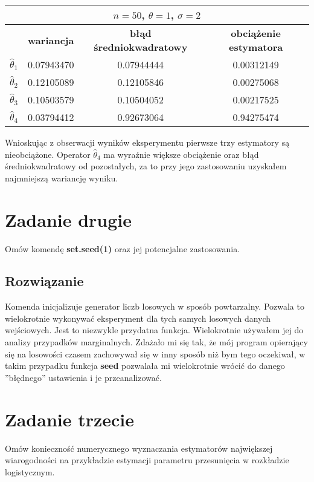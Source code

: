 \documentclass[a4paper]{article}
\begin{document}
\begin{table}[H]
\centering
\begin{tabular}{|c|c|c|c|}
\hline
\multicolumn{4}{|c|}{$n=50$, $\theta=1$, $\sigma=2$} \\ \hline
                  & \textbf{wariancja}   & \textbf{błąd średniokwadratowy} & \textbf{obciążenie estymatora} \\ \hline
$\hat{\theta}_1$ & 0.07943470 & 0.07944444 & 0.00312149 \\ \hline
$\hat{\theta}_2$ & 0.12105089 & 0.12105846 & 0.00275068 \\ \hline
$\hat{\theta}_3$ & 0.10503579 & 0.10504052 & 0.00217525 \\ \hline
$\hat{\theta}_4$ & 0.03794412 & 0.92673064 & 0.94275474 \\ \hline
\end{tabular}
\end{table}

Wnioskując z obserwacji wyników eksperymentu pierwsze trzy estymatory są nieobciążone. Operator $\hat{\theta}_4$ ma wyraźnie większe obciążenie oraz błąd średniokwadratowy od  pozostałych, za to przy jego zastosowaniu uzyskałem najmniejszą wariancję wyniku.

\section{Zadanie drugie}
Omów komendę \textbf{set.seed(1)} oraz jej potencjalne zastosowania.

\subsection{Rozwiązanie}
Komenda inicjalizuje generator liczb losowych w sposób powtarzalny. Pozwala to wielokrotnie wykonywać eksperyment dla tych samych losowych danych wejściowych. Jest to niezwykle przydatna funkcja. Wielokrotnie używałem jej do analizy przypadków marginalnych. Zdażało mi się tak, że mój program opierający się na losowości czasem zachowywał się w inny sposób niż bym tego oczekiwał, w takim przypadku funkcja \textbf{seed} pozwalała mi wielokrotnie wrócić do danego ''błędnego''  ustawienia i je przeanalizować.


\section{Zadanie trzecie}
Omów konieczność numerycznego wyznaczania estymatorów największej wiarogodności na przykładzie estymacji parametru przesunięcia w rozkładzie logistycznym.
\end{document}
